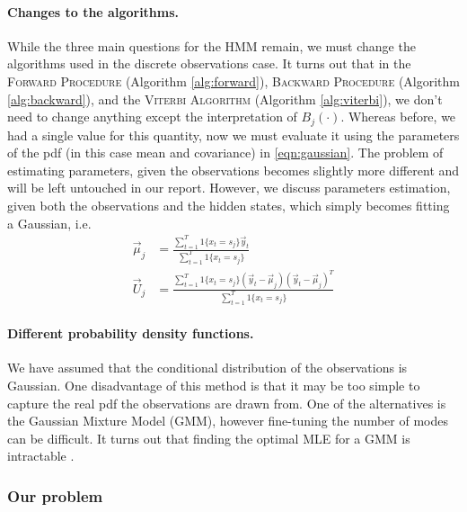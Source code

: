 \paragraph{Changes to the algorithms.}
	While the three main questions for the HMM remain, we must change the algorithms used in the discrete observations case. It turns out that in the \textsc{Forward Procedure} (Algorithm \ref{alg:forward}), \textsc{Backward Procedure} (Algorithm \ref{alg:backward}), and the \textsc{Viterbi Algorithm} (Algorithm \ref{alg:viterbi}), we don't need to change anything except the interpretation of $B_j(\cdot)$. Whereas before, we had a single value for this quantity, now we must evaluate it using the parameters of the pdf (in this case mean and covariance) in \eqref{eqn:gaussian}. The problem of estimating parameters, given the observations becomes slightly more different and will be left untouched in our report. However, we discuss parameters estimation, given both the observations and the hidden states, which simply becomes fitting a Gaussian, i.e.
	\begin{align}
		\vec\mu_j & = \frac{\sum_{t = 1}^T 1\{x_t = s_j\} \vec y_t}{\sum_{t = 1}^T 1\{x_t = s_j\}} \\
		\vec U_j & = \frac{\sum_{t = 1}^T 1\{x_t = s_j\} (\vec y_t - \vec\mu_j)(\vec y_t - \vec\mu_j)^T}{\sum_{t = 1}^T 1\{x_t = s_j\}}
	\end{align}

\paragraph{Different probability density functions.}
	We have assumed that the conditional distribution of the observations is Gaussian. One disadvantage of this method is that it may be too simple to capture the real pdf the observations are drawn from. One of the alternatives is the Gaussian Mixture Model (GMM), however fine-tuning the number of modes can be difficult. It turns out that finding the optimal MLE for a GMM is intractable \cite{mlBook}.
	
\subsubsection{Our problem}
